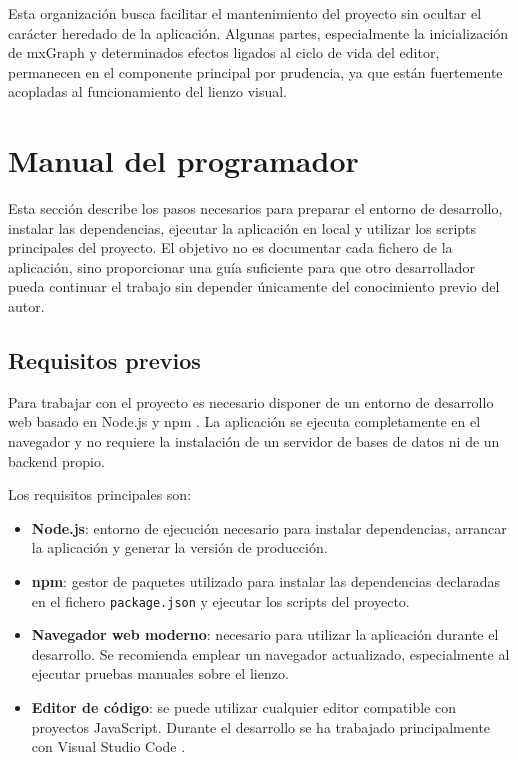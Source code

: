 Esta organización busca facilitar el mantenimiento del proyecto sin ocultar el carácter heredado de la aplicación. Algunas partes, especialmente la inicialización de mxGraph y determinados efectos ligados al ciclo de vida del editor, permanecen en el componente principal por prudencia, ya que están fuertemente acopladas al funcionamiento del lienzo visual.

\section{Manual del programador}

Esta sección describe los pasos necesarios para preparar el entorno de desarrollo, instalar las dependencias, ejecutar la aplicación en local y utilizar los scripts principales del proyecto. El objetivo no es documentar cada fichero de la aplicación, sino proporcionar una guía suficiente para que otro desarrollador pueda continuar el trabajo sin depender únicamente del conocimiento previo del autor.

\subsection{Requisitos previos}

Para trabajar con el proyecto es necesario disponer de un entorno de desarrollo web basado en Node.js y npm \cite{nodejs,npm}. La aplicación se ejecuta completamente en el navegador y no requiere la instalación de un servidor de bases de datos ni de un backend propio.

Los requisitos principales son:

\begin{itemize}
\item \textbf{Node.js}: entorno de ejecución necesario para instalar dependencias, arrancar la aplicación y generar la versión de producción.

\item \textbf{npm}: gestor de paquetes utilizado para instalar las dependencias declaradas en el fichero \texttt{package.json} y ejecutar los scripts del proyecto.

\item \textbf{Navegador web moderno}: necesario para utilizar la aplicación durante el desarrollo. Se recomienda emplear un navegador actualizado, especialmente al ejecutar pruebas manuales sobre el lienzo.

\item \textbf{Editor de código}: se puede utilizar cualquier editor compatible con proyectos JavaScript. Durante el desarrollo se ha trabajado principalmente con Visual Studio Code \cite{vscode}.

\end{itemize}

